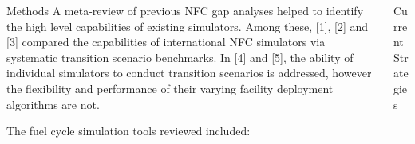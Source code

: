 \documentclass[final]{beamer}
\newlength{\onecolwid}
\newlength{\twocolwid}
\begin{document}
\begin{frame}[t]
\begin{columns}[t]
\begin{column}{\twocolwid}
\begin{columns}[t,totalwidth=\twocolwid]
\begin{column}{\onecolwid}
\begin{block}{Methods}
A meta-review of previous NFC gap analyses helped to identify the high level capabilities of existing simulators. Among these, [1], [2] and [3] compared the capabilities of international NFC simulators via systematic transition scenario benchmarks. In [4] and [5], the ability of individual simulators to conduct transition scenarios is addressed, however the flexibility and performance of their varying facility deployment algorithms are not.

The fuel cycle simulation tools reviewed included:
\begin{table}[h]
	\centering
	
	\caption {Algorithm Details}
\end{table}
		
\end{block}


\end{column} %

\begin{column}{\onecolwid}\vspace{-.6in} %


\begin{block}{Current Strategies}


\end{block}
\end{column}
\end{columns}
\end{column}
\end{columns}
\end{frame}
\end{document}
